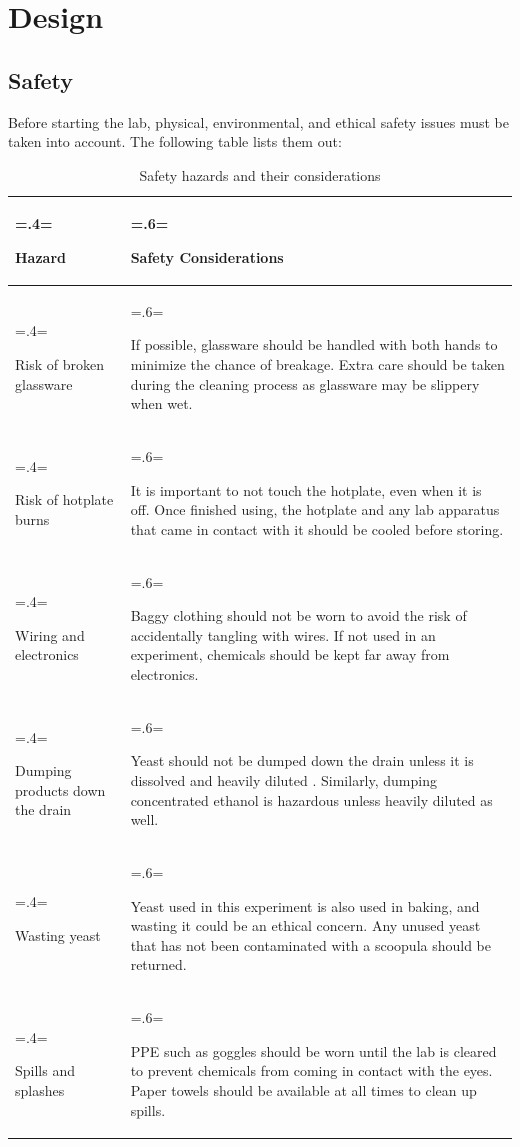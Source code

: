 \documentclass{article}
\begin{document}
\newpage

\section{Design}

\subsection{Safety}
Before starting the lab, physical, environmental, and ethical safety issues must be taken into account. The following table lists them out:
\begin{table}[H]
\centering
\caption{Safety hazards and their considerations}
\label{table:1}
\begin{tabularx}{\textwidth} {
    | >{\hsize=.4\hsize \linewidth=\hsize \raggedright\arraybackslash}X
    | >{\hsize=.6\hsize \linewidth=\hsize \raggedright\arraybackslash}X |
}
    \hline
    \textbf{Hazard} & \textbf{Safety Considerations} \\
    \hline
    Risk of broken glassware & If possible, glassware should be handled with both hands to minimize the chance of breakage. Extra care should be taken during the cleaning process as glassware may be slippery when wet.\\
    \hline
    Risk of hotplate burns & It is important to not touch the hotplate, even when it is off. Once finished using, the hotplate and any lab apparatus that came in contact with it should be cooled before storing.\\
    \hline
    Wiring and electronics & Baggy clothing should not be worn to avoid the risk of accidentally tangling with wires. If not used in an experiment, chemicals should be kept far away from electronics.\\
    \hline
    Dumping products down the drain & Yeast should not be dumped down the drain unless it is dissolved and heavily diluted \parencite{ref}. Similarly, dumping concentrated ethanol is hazardous unless heavily diluted as well. \parencite{ref}\\
    \hline
    Wasting yeast & Yeast used in this experiment is also used in baking, and wasting it could be an ethical concern. Any unused yeast that has not been contaminated with a scoopula should be returned.\\
    \hline
    Spills and splashes & PPE such as goggles should be worn until the lab is cleared to prevent chemicals from coming in contact with the eyes. Paper towels should be available at all times to clean up spills.\\
    \hline
\end{tabularx}
\end{table}
\end{document}
